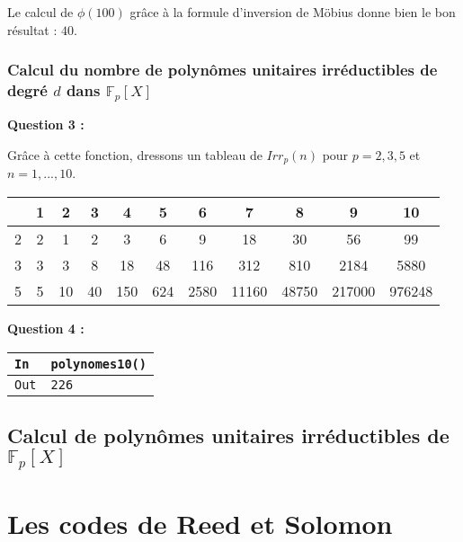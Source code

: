 \documentclass[titlepage]{article}
\begin{document}
            Le calcul de $\phi (100)$ grâce à la formule d'inversion de Möbius donne bien le bon résultat : $40$.

            \subsubsection{Calcul du nombre de polynômes unitaires irréductibles de degré $d$ dans $\mathbb{F}_p[X]$}
            \textbf{Question 3 :}
            
            Grâce à cette fonction, dressons un tableau de $Irr_p(n)$ pour $p = 2, 3, 5$ et $n = 1, . . . , 10$.

            \begin{tabular}{|c|c c c c c c c c c c|}
                \hline
                & 1 & 2 & 3 & 4 & 5 & 6 & 7 & 8 & 9 & 10 \\
                \hline
                2 & 2 & 1 & 2 & 3 & 6 & 9 & 18 & 30 & 56 & 99 \\
                3 & 3 & 3 & 8 & 18 & 48 & 116 & 312 & 810 & 2184 & 5880 \\
                5 & 5 & 10 & 40 & 150 & 624 & 2580 & 11160 &  48750 & 217000 & 976248 \\ 
                \hline
            \end{tabular}
            \bigbreak

            \textbf{Question 4 :}
            

            \begin{tabularx}{12cm}{|p{0.60cm}|X|}
                \hline
                \rowcolor{gray}
                \texttt{In}
                & 
                \texttt{polynomes10()}
                \\
                \hline
                \texttt{Out}
                &
                \texttt{226}
                \\
                \hline
            \end{tabularx}
            \bigbreak

        \subsection{Calcul de polynômes unitaires irréductibles de $\mathbb{F}_p[X]$}
    
    \section{Les codes de Reed et Solomon}
\end{document}
